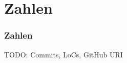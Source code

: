 \section*{Zahlen}

\begin{frame}
    \frametitle{Zahlen}

    TODO: Commits, LoCs, GitHub URI

\end{frame}

